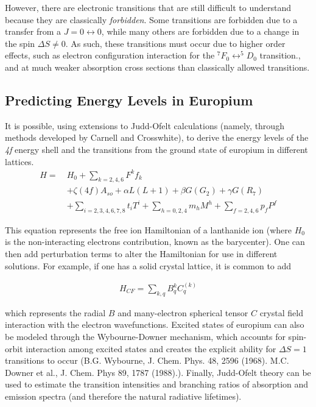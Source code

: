 However, there are electronic transitions that are still difficult to
understand because they are classically \emph{forbidden}. Some transitions
are forbidden due to a transfer from a $ J=0 \leftrightarrow 0 $, while
many others are forbidden due to a change in the spin $\Delta S \neq
0$. As such, these transitions must occur due to higher order effects,
such as electron configuration interaction for the $^7F_0 \leftrightarrow ^5D_0$
transition., and at much weaker
absorption cross sections than classically allowed transitions.


\subsection{Predicting Energy Levels in Europium}

It is possible, using extensions to Judd-Ofelt calculations (namely, through methods developed by Carnell and Crosswhite), to derive the energy levels of the \textsl{4f} energy shell and the transitions from the ground state of europium in different lattices.
\begin{align*}
H =\ & H_0 + \sum_{k=2,4,6} F^kf_k \\
 & + \zeta(4f)A_{so} + \alpha L(L+1) + \beta G(G_2) + \gamma G(R_7)\\
 & + \sum_{i=2,3,4,6,7,8}t_iT^i + \sum_{h=0,2,4}m_hM^h + \sum_{f=2,4,6}p_fP^f
\end{align*}

This equation represents the free ion Hamiltonian of a lanthanide ion (where
$H_0$ is the non-interacting electrons contribution, known as the barycenter).
One can then add perturbation terms to alter the Hamiltonian for use in
different solutions. For example, if one has a solid crystal lattice, it is
common to add

\begin{align*}
  H_{CF} = \sum_{k,q} B_q^k C_q^{(k)}
\end{align*}

which represents the radial $B$ and many-electron spherical tensor $C$ crystal
field interaction with the electron wavefunctions. Excited states of europium
can also be modeled through the Wybourne-Downer mechanism, which accounts for
spin-orbit interaction among excited states and creates the explicit ability
for $\Delta S = 1$ transitions to occur (B.G. Wybourne, J. Chem. Phys. 48,
2596 (1968). M.C. Downer et al., J. Chem. Phys 89, 1787 (1988).). Finally,
Judd-Ofelt theory can be used to estimate the transition intensities and
branching ratios of absorption and emission spectra (and therefore the natural
radiative lifetimes).

